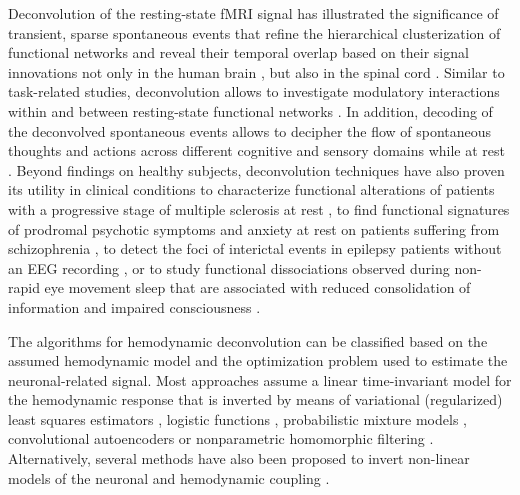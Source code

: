 Deconvolution of the resting-state fMRI signal has illustrated the significance
of transient, sparse spontaneous events
\citep{Petridou2012PeriodsrestfMRI,Allan2015FunctionalConnectivityMRI} that
refine the hierarchical clusterization of functional networks
\citep{Karahanoglu2013TotalactivationfMRI} and reveal their temporal overlap
based on their signal innovations not only in the human brain
\citep{Karahanoglu2015Transientbrainactivity}, but also in the spinal cord
\citep{kinany2020DynamicFunctionalConnectivity}. Similar to task-related
studies, deconvolution allows to investigate modulatory interactions within and
between resting-state functional networks
\citep{Di2013ModulatoryInteractionsResting,Di2015Characterizationsrestingstate}.
In addition, decoding of the deconvolved spontaneous events allows to decipher
the flow of spontaneous thoughts and actions across different cognitive and
sensory domains while at rest
\citep{Karahanoglu2015Transientbrainactivity,GonzalezCastillo2019Imagingspontaneousflow,Tan_2017}.
Beyond findings on healthy subjects, deconvolution techniques have also proven
its utility in clinical conditions to characterize functional alterations of
patients with a progressive stage of multiple sclerosis at rest
\citep{Bommarito2020Alteredanteriordefault}, to find functional signatures
of prodromal psychotic symptoms and anxiety at rest on patients suffering from
schizophrenia \citep{Zoeller2019Largescalebrain}, to detect the foci of
interictal events in epilepsy patients without an EEG recording
\citep{Lopes2012Detectionepilepticactivity,Karahanoglu2013Spatialmappinginterictal},
or to study functional dissociations observed during non-rapid eye movement
sleep that are associated with reduced consolidation of information and impaired
consciousness \citep{Tarun2020NREMsleepstages}.

The algorithms for hemodynamic deconvolution can be classified based on the
assumed hemodynamic model and the optimization problem used to estimate the
neuronal-related signal. Most approaches assume a linear time-invariant model
for the hemodynamic response that is inverted by means of variational
(regularized) least squares estimators
\citep{Glover1999DeconvolutionImpulseResponse,Gitelman2003Modelingregionalpsychophysiologic,
Gaudes2010Detectioncharacterizationsingle,Gaudes2012Structuredsparsedeconvolution,
Gaudes2013Paradigmfreemapping,CaballeroGaudes2019deconvolutionalgorithmmulti,
HernandezGarcia2011Neuronaleventdetection,Karahanoglu2013TotalactivationfMRI,
Cherkaoui2019SparsitybasedBlind,Costantini2021ParadigmFreeRegularization,
Huetel2021Hemodynamicmatrixfactorization},
logistic functions
\citep{Bush2013Decodingneuralevents,Bush2015deconvolutionbasedapproach,
Loula2018DecodingfMRIactivity},
probabilistic mixture models \citep{Pidnebesna2019EstimatingSparseNeuronal},
convolutional autoencoders \citep{Huetel2018NeuralActivationEstimation} or
nonparametric homomorphic filtering
\citep{Sreenivasan2015NonparametricHemodynamicDeconvolution}. Alternatively,
several methods have also been proposed to invert non-linear models of the
neuronal and hemodynamic coupling
\citep{Riera2004statespacemodel,Friston2008DEMvariationaltreatment,
Havlicek2011Dynamicmodelingneuronal,Aslan2016Jointstateparameter,
Madi2017HybridCubatureKalman,ruizeuler2018nonlinear}.


